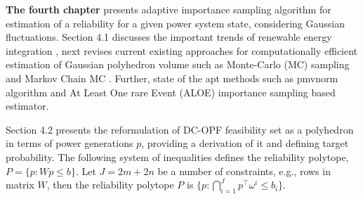 \textbf{The fourth chapter} presents adaptive importance sampling algorithm for estimation of a reliability for a given power system state, considering Gaussian fluctuations. Section 4.1 discusses the important trends of renewable energy integration \cite{harjanne2019abandoning, golden2003senate}, next revises current existing approaches for computationally efficient estimation of Gaussian polyhedron volume such as Monte-Carlo (MC) sampling and Markov Chain MC \cite{su2005probabilistic,vittal2009steady,chen2008probabilistic, montecarlofeasibility}. Further, state of the apt methods such as pmvnorm algorithm \cite{genz2020package} and At Least One rare Event (ALOE) \cite{owen2019importance} importance sampling based estimator.

Section 4.2 presents the reformulation of DC-OPF feasibility set as a polyhedron in terms of power generations $p$, providing a derivation of it and defining target probability.
The following system of inequalities defines the reliability polytope, $P = \{p: Wp \le b\}$.
Let $J = 2m + 2n$ be a number of constraints, e.g., rows in matrix $W$, then the reliability polytope $P$ is $\bigl\{p\!:\! \bigcap_{i=1}^J p^\top\!\!\omega^i \le b_i\bigr\}$.

